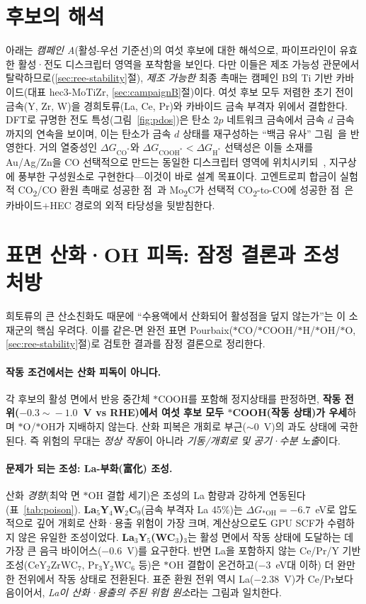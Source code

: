 \documentclass[11pt,a4paper]{report}
\newcommand{\dGCO}{\Delta G_{\mathrm{CO^*}}}
\newcommand{\dGH}{\Delta G_{\mathrm{H^*}}}
\newcommand{\dGCOOH}{\Delta G_{\mathrm{COOH^*}}}
\begin{document}
\section{후보의 해석}
아래는 \emph{캠페인 A}(활성-우선 기준선)의 여섯 후보에 대한 해석으로, 파이프라인이 유효한 활성·전도
디스크립터 영역을 포착함을 보인다. 다만 이들은 제조 가능성 관문에서 탈락하므로(\ref{sec:ree-stability}절),
\emph{제조 가능한} 최종 촉매는 캠페인 B의 Ti 기반 카바이드(대표 hec3-MoTiZr, \ref{sec:campaignB}절)이다.
여섯 후보 모두 저렴한 초기 전이금속(Y, Zr, W)을 경희토류(La, Ce, Pr)와 카바이드 금속 부격자 위에서
결합한다. DFT로 규명한 전도 특성(그림~\ref{fig:pdos})은 탄소 $2p$ 네트워크 금속에서 금속 $d$ 금속까지의
연속을 보이며, 이는 탄소가 금속 $d$ 상태를 재구성하는 ``백금 유사'' 그림~\cite{levy1973}을 반영한다.
거의 열중성인 $\dGCO$와 $\dGCOOH<\dGH$ 선택성은 이들 소재를 Au/Ag/Zn을 CO 선택적으로 만드는 동일한
디스크립터 영역에 위치시키되~\cite{hori2008}, 지구상에 풍부한 구성원소로 구현한다---이것이 바로 설계
목표이다. 고엔트로피 합금이 실험적 CO\textsubscript{2}/CO 환원 촉매로 성공한 점~\cite{nellaiappan2020,batchelor2019}과
Mo\textsubscript{2}C가 선택적 CO\textsubscript{2}-to-CO에 성공한 점~\cite{porosoff2014}은 카바이드+HEC
경로의 외적 타당성을 뒷받침한다.

\section{표면 산화·OH 피독: 잠정 결론과 조성 처방}
\label{sec:disc-poison}
희토류의 큰 산소친화도 때문에 ``수용액에서 산화되어 활성점을 덮지 않는가''는 이 소재군의 핵심
우려다. 이를 같은-면 완전 표면 Pourbaix($*$CO/$*$COOH/$*$H/$*$OH/$*$O, \ref{sec:ree-stability}절)로
검토한 결과를 잠정 결론으로 정리한다.

\paragraph{작동 조건에서는 산화 피독이 아니다.} 각 후보의 활성 면에서 반응 중간체 $*$COOH를 포함해
정지상태를 판정하면, \textbf{작동 전위($-0.3\!\sim\!-1.0$~V vs RHE)에서 여섯 후보 모두 $*$COOH(작동
상태)가 우세}하며 $*$O/$*$OH가 지배하지 않는다. 산화 피복은 개회로 부근($\sim\!0$~V)의 과도 상태에
국한된다. 즉 위험의 무대는 \emph{정상 작동}이 아니라 \emph{기동/개회로 및 공기·수분 노출}이다.

\paragraph{문제가 되는 조성: La-부화(富化) 조성.} 산화 \emph{경향}(최악 면 $*$OH 결합 세기)은
조성의 La 함량과 강하게 연동된다(표~\ref{tab:poison}). \textbf{La$_5$Y$_4$W$_2$C$_9$}(금속 부격자 La
45\%)는 $\Delta G_{*\mathrm{OH}}=-6.7$~eV로 압도적으로 깊어 개회로 산화·용출 위험이 가장 크며,
계산상으로도 GPU SCF가 수렴하지 않은 유일한 조성이었다. \textbf{La$_3$Y$_5$(WC$_3$)$_3$}는 활성 면에서
작동 상태에 도달하는 데 가장 큰 음극 바이어스($-0.6$~V)를 요구한다. 반면 La을 포함하지 않는 Ce/Pr/Y
기반 조성(CeY$_2$ZrWC$_7$, Pr$_3$Y$_2$WC$_6$ 등)은 $*$OH 결합이 온건하고($-3$~eV대 이하) 더 완만한
전위에서 작동 상태로 전환된다. 표준 환원 전위 역시 La($-2.38$~V)가 Ce/Pr보다 음이어서, \emph{La이
산화·용출의 주된 위험 원소}라는 그림과 일치한다.
\end{document}

